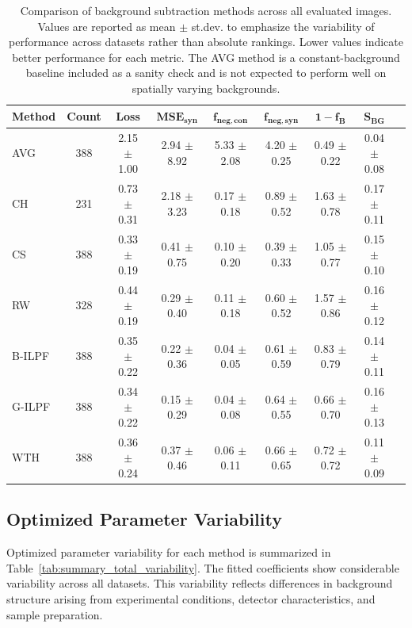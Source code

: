 \documentclass[iucr]{iucrjournals}
\begin{document}
\begin{table}[t]
\caption{Comparison of background subtraction methods across all evaluated images. Values are reported as mean $\pm$ st.dev. to emphasize the variability of performance across datasets rather than absolute rankings. Lower values indicate better performance for each metric. The AVG method is a constant-background baseline included as a sanity check and is not expected to perform well on spatially varying backgrounds.}
\label{tab:method_performance_new}
\centering
\small
\setlength{\tabcolsep}{3pt}
\renewcommand{\arraystretch}{1.1}
\begin{tabular}{@{}lcccccccc@{}}
\toprule
\textbf{Method} & \textbf{Count} & \textbf{Loss} &
$\mathbf{MSE}_{\mathbf{syn}}$ &
$\mathbf{f}_{\mathbf{neg,con}}$ &
$\mathbf{f}_{\mathbf{neg,syn}}$ &
$\mathbf{1-f_B}$ &
$\mathbf{S}_{\mathbf{BG}}$ \\ \midrule
AVG & 388 & 2.15 $\pm$ 1.00 & 2.94 $\pm$ 8.92 & 5.33 $\pm$ 2.08 & 4.20 $\pm$ 0.25 & 0.49 $\pm$ 0.22 & 0.04 $\pm$ 0.08 \\
CH & 231 & 0.73 $\pm$ 0.31 & 2.18 $\pm$ 3.23 & 0.17 $\pm$ 0.18 & 0.89 $\pm$ 0.52 & 1.63 $\pm$ 0.78 & 0.17 $\pm$ 0.11 \\
CS & 388 & 0.33 $\pm$ 0.19 & 0.41 $\pm$ 0.75 & 0.10 $\pm$ 0.20 & 0.39 $\pm$ 0.33 & 1.05 $\pm$ 0.77 & 0.15 $\pm$ 0.10 \\
RW & 328 & 0.44 $\pm$ 0.19 & 0.29 $\pm$ 0.40 & 0.11 $\pm$ 0.18 & 0.60 $\pm$ 0.52 & 1.57 $\pm$ 0.86 & 0.16 $\pm$ 0.12 \\
B-ILPF & 388 & 0.35 $\pm$ 0.22 & 0.22 $\pm$ 0.36 & 0.04 $\pm$ 0.05 & 0.61 $\pm$ 0.59 & 0.83 $\pm$ 0.79 & 0.14 $\pm$ 0.11 \\
G-ILPF & 388 & 0.34 $\pm$ 0.22 & 0.15 $\pm$ 0.29 & 0.04 $\pm$ 0.08 & 0.64 $\pm$ 0.55 & 0.66 $\pm$ 0.70 & 0.16 $\pm$ 0.13 \\
WTH & 388 & 0.36 $\pm$ 0.24 & 0.37 $\pm$ 0.46 & 0.06 $\pm$ 0.11 & 0.66 $\pm$ 0.65 & 0.72 $\pm$ 0.72 & 0.11 $\pm$ 0.09 \\
\bottomrule
\end{tabular}
\end{table}




\subsection{Optimized Parameter Variability}

Optimized parameter variability for each method is summarized in Table~\ref{tab:summary_total_variability}. The fitted coefficients show considerable variability across all datasets. This variability reflects differences in background structure arising from experimental conditions, detector characteristics, and sample preparation. 
\end{document}
